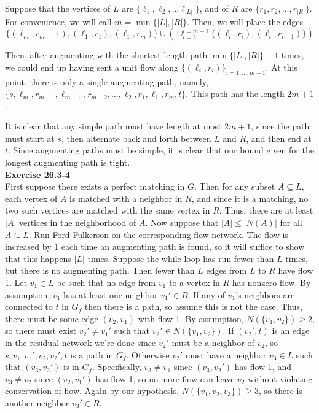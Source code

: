 \documentclass{article}
\begin{document}
Suppose that the vertices of $L$ are $\{\ell_1, \ell_2, \ldots \ell_{|L|}\}$, and of $R$ are $\{r_1,r_2, \ldots, r_{|R|}\}$. For convenience, we will call $m = \min\{|L|,|R|\}$. Then, we will place the edges 
\[
\{(\ell_{m} , r_{m}-1),(\ell_1,r_1), (\ell_1, r_m)\} \cup \left(\cup_{i=2}^{i=m-1} \{(\ell_i,r_i),(\ell_i,r_{i-1})\}\right)
\]

Then, after augmenting with the shortest length path $\min\{|L|,|R|\}-1$ times, we could end up having sent a unit flow along $\{(\ell_i,r_i)\}_{i =1,\ldots,m-1}$. At this point, there is only a single augmenting path, namely, $\{s,\ell_m,r_{m-1},\ell_{m-1}, r_{m-2}, \ldots, \ell_2, r_1,\ell_1, r_m,  t\}$. This path has the length $2 m+1$.

It is clear that any simple path must have length at most $2m +1$, since the path must start at $s$, then alternate back and forth between $L$ and $R$, and then end at $t$. Since augmenting paths must be simple, it is clear that our bound given for the longest augmenting path is tight.\\

\noindent\textbf{Exercise 26.3-4}\\

First suppose there exists a perfect matching in $G$.  Then for any subset $A \subseteq L$, each vertex of $A$ is matched with a neighbor in $R$, and since it is a matching, no two such vertices are matched with the same vertex in $R$.  Thus, there are at least $|A|$ vertices in the neighborhood of $A$.  Now suppose that $|A| \leq |N(A)|$ for all $A \subseteq L$.  Run Ford-Fulkerson on the corresponding flow network. The flow is increased by 1 each time an augmenting path is found, so it will suffice to show that this happens $|L|$ times. Suppose the while loop has run fewer than $L$ times, but there is no augmenting path.  Then fewer than $L$ edges from $L$ to $R$ have flow 1.  Let $v_1 \in L$ be such that no edge from $v_1$ to a vertex in $R$ has nonzero flow.  By assumption, $v_1$ has at least one neighbor $v_1' \in R$.  If any of $v_1$'s neighbors are connected to $t$ in $G_f$ then there is a path, so assume this is not the case. Thus, there must be some edge $(v_2, v_1)$ with flow 1.  By assumption, $N(\{v_1, v_2\}) \geq 2$, so there must exist $v_2' \neq v_1'$ such that $v_2' \in N(\{v_1, v_2\})$.  If $(v_2',t)$ is an edge in the residual network we're done since $v_2'$ must be a neighbor of $v_2$, so $s, v_1, v_1', v_2, v_2', t$ is a path in $G_f$.  Otherwise $v_2'$ must have a neighbor $v_3 \in L$ such that $(v_3, v_2')$ is in $G_f$.  Specifically, $v_3 \neq v_1$ since $(v_3, v_2')$ has flow 1, and $v_3 \neq v_2$ since $(v_2, v_1')$ has flow 1, so no more flow can leave $v_2$ without violating conservation of flow.  Again by our hypothesis, $N(\{v_1, v_2, v_3\}) \geq 3$, so there is another neighbor $v_3' \in R$.  
\end{document}
